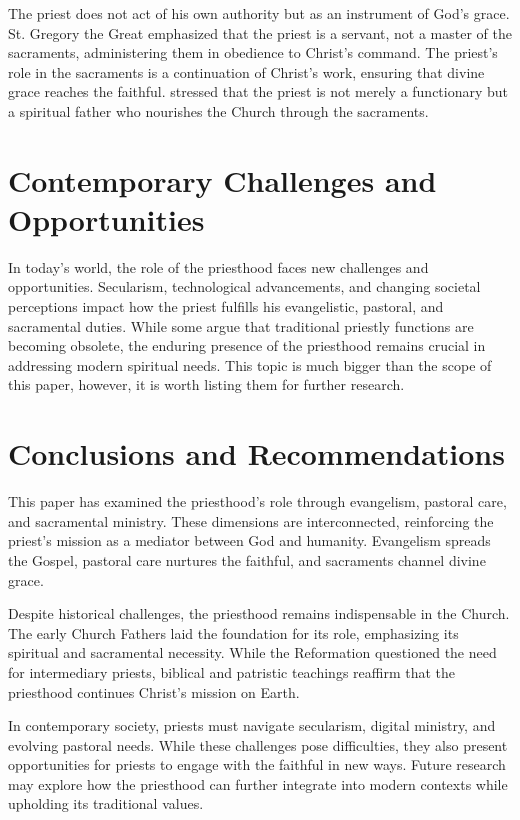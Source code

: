 \documentclass[12pt,doc]{apa7}   	%
\begin{document}
The priest does not act of his own authority but as an instrument of God’s grace. St. Gregory the Great \citep{early_church_akin} emphasized that the priest is a servant, not a master of the sacraments, administering them in obedience to Christ’s command.  The priest’s role in the sacraments is a continuation of Christ’s work, ensuring that divine grace reaches the faithful. \citet{priesthood_shenouda} stressed that the priest is not merely a functionary but a spiritual father who nourishes the Church through the sacraments.

\section{Contemporary Challenges and Opportunities}

In today’s world, the role of the priesthood faces new challenges and opportunities. Secularism, technological advancements, and changing societal perceptions impact how the priest fulfills his evangelistic, pastoral, and sacramental duties. While some argue that traditional priestly functions are becoming obsolete, the enduring presence of the priesthood remains crucial in addressing modern spiritual needs. This topic is much bigger than the scope of this paper, however, it is worth listing them for further research.

\section{Conclusions and Recommendations}

This paper has examined the priesthood’s role through evangelism, pastoral care, and sacramental ministry. These dimensions are interconnected, reinforcing the priest’s mission as a mediator between God and humanity. Evangelism spreads the Gospel, pastoral care nurtures the faithful, and sacraments channel divine grace.

Despite historical challenges, the priesthood remains indispensable in the Church. The early Church Fathers laid the foundation for its role, emphasizing its spiritual and sacramental necessity. While the Reformation questioned the need for intermediary priests, biblical and patristic teachings reaffirm that the priesthood continues Christ’s mission on Earth.

In contemporary society, priests must navigate secularism, digital ministry, and evolving pastoral needs. While these challenges pose difficulties, they also present opportunities for priests to engage with the faithful in new ways. Future research may explore how the priesthood can further integrate into modern contexts while upholding its traditional values.
\end{document}
